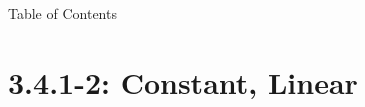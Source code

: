 


\begin{frame}{Table of Contents}

\mapofcontentsC{\cd}
\end{frame}


\section*{3.4.1-2: Constant, Linear}

